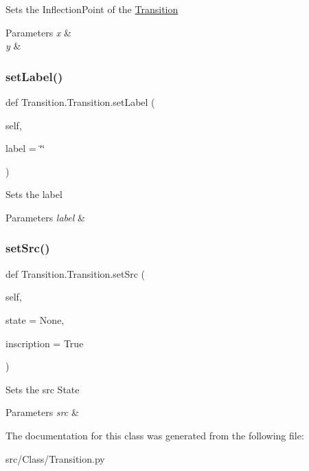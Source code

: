Sets the Inflection\+Point of the \mbox{\hyperlink{classTransition_1_1Transition}{Transition}}   


\begin{DoxyParams}{Parameters}
{\em x} &  \\
\hline
{\em y} & \\
\hline
\end{DoxyParams}
\mbox{\label{classTransition_1_1Transition_a736ddbe1e360e1c20e398582434d0585}} 
\subsubsection{\texorpdfstring{setLabel()}{setLabel()}}
{\footnotesize\ttfamily def Transition.\+Transition.\+set\+Label (\begin{DoxyParamCaption}\item[{}]{self,  }\item[{}]{label = {\ttfamily \char`\"{}\char`\"{}} }\end{DoxyParamCaption})}



Sets the label   


\begin{DoxyParams}{Parameters}
{\em label} & \\
\hline
\end{DoxyParams}
\mbox{\label{classTransition_1_1Transition_a4f41a055992fab35a7e7237de4a18bf6}} 
\subsubsection{\texorpdfstring{setSrc()}{setSrc()}}
{\footnotesize\ttfamily def Transition.\+Transition.\+set\+Src (\begin{DoxyParamCaption}\item[{}]{self,  }\item[{}]{state = {\ttfamily None},  }\item[{}]{inscription = {\ttfamily True} }\end{DoxyParamCaption})}



Sets the src State   


\begin{DoxyParams}{Parameters}
{\em src} & \\
\hline
\end{DoxyParams}


The documentation for this class was generated from the following file\+:\begin{DoxyCompactItemize}
\item 
src/\+Class/Transition.\+py\end{DoxyCompactItemize}
